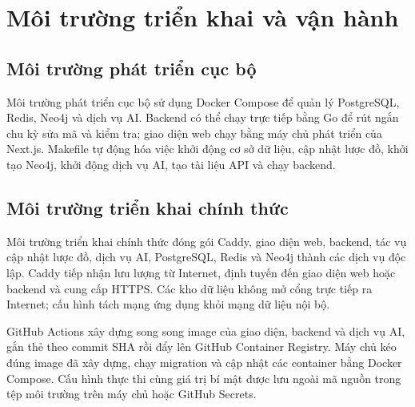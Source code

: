 \section{Môi trường triển khai và vận hành}
\label{sec:ch3-demo-deployment}

\subsection{Môi trường phát triển cục bộ}

Môi trường phát triển cục bộ sử dụng Docker Compose để quản lý PostgreSQL, Redis, Neo4j và dịch vụ AI. Backend có thể chạy trực tiếp bằng Go để rút ngắn chu kỳ sửa mã và kiểm tra; giao diện web chạy bằng máy chủ phát triển của Next.js. Makefile tự động hóa việc khởi động cơ sở dữ liệu, cập nhật lược đồ, khởi tạo Neo4j, khởi động dịch vụ AI, tạo tài liệu API và chạy backend.

\subsection{Môi trường triển khai chính thức}

Môi trường triển khai chính thức đóng gói Caddy, giao diện web, backend, tác vụ cập nhật lược đồ, dịch vụ AI, PostgreSQL, Redis và Neo4j thành các dịch vụ độc lập. Caddy tiếp nhận lưu lượng từ Internet, định tuyến đến giao diện web hoặc backend và cung cấp HTTPS. Các kho dữ liệu không mở cổng trực tiếp ra Internet; cấu hình tách mạng ứng dụng khỏi mạng dữ liệu nội bộ.

GitHub Actions xây dựng song song image của giao diện, backend và dịch vụ AI, gắn thẻ theo commit SHA rồi đẩy lên GitHub Container Registry. Máy chủ kéo đúng image đã xây dựng, chạy migration và cập nhật các container bằng Docker Compose. Cấu hình thực thi cùng giá trị bí mật được lưu ngoài mã nguồn trong tệp môi trường trên máy chủ hoặc GitHub Secrets.


